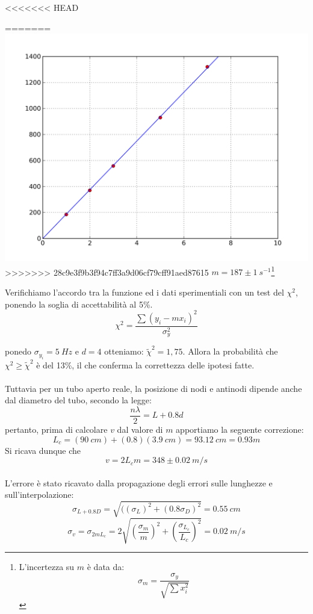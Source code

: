 \begin{center}
<<<<<<< HEAD

=======
\includegraphics[scale=0.5]{../grafici/tubo/tubo1.png}
>>>>>>> 28c9e3f9b3f94c7ff3a9d06cf79cff91aed87615
$m = 187\pm 1\ s^{-1}$\hspace{1cm}\footnote{L'incertezza su $m$ è data da: $$\sigma_m=\frac{\sigma_y}{\sqrt{\sum{x_i^2}}}$$}
\end{center}

Verifichiamo l'accordo tra la funzione ed i dati sperimentiali con un test del $\chi^2$, ponendo la soglia di accettabilità al 5\%.
\begin{equation}\label{chi2}
\chi^2=\displaystyle{\frac{\sum{(y_i-mx_i)^2}}{\sigma_{y}^2}}
\end{equation}

ponedo $\sigma_{y_i}=5\ Hz$ e $d=4$ otteniamo: $\tilde{\chi}^2=1,75$. Allora la probabilità che $\chi^2\geq\tilde{\chi}^2$ è del 13\%, il che conferma la correttezza delle ipotesi fatte.\\
\\
Tuttavia per un tubo aperto reale, la posizione di nodi e antinodi dipende anche dal diametro del tubo, secondo la legge:
$$\frac{n\lambda}{2}=L+0.8d$$ pertanto, prima di calcolare $v$ dal valore di $m$ apportiamo la seguente correzione:
$$ L_c = (90\ cm)+(0.8)(3.9\ cm) = 93.12\ cm = 0.93 m $$
Si ricava dunque che $$v=2L_cm=348\pm0.02\ m/s$$
\\
L'errore è stato ricavato dalla propagazione degli errori sulle lunghezze e sull'interpolazione:
$$\sigma_{L+0.8D}=\sqrt{((\sigma_L)^2+(0.8\sigma_D)^2}=0.55\ cm$$
$$\sigma_v= \sigma_{2mL_c}= 2\sqrt{\left(\frac{\sigma_m}{m}\right)^2+\left(\frac{\sigma_{L_{c}}}{L_c}\right)^2}= 0.02\ m/s$$


